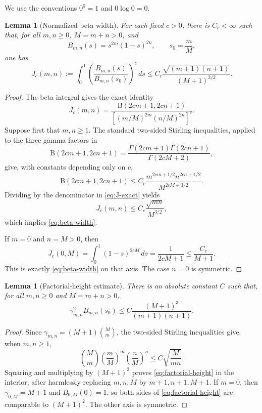 \documentclass[11pt]{article}
\newtheorem{lemma}[theorem]{Lemma}
\newcommand{\dd}{\,d}
\begin{document}
We use the conventions \(0^0=1\) and \(0\log0=0\).

\begin{lemma}[Normalized beta width]\label{lem:beta}
For each fixed \(c>0\), there is \(C_c<\infty\) such that, for all
\(m,n\geq0\), \(M=m+n>0\), and
\[
 B_{m,n}(s)=s^{2m}(1-s)^{2n},\qquad s_0=\frac mM,
\]
one has
\begin{equation}\label{eq:beta-width}
 J_c(m,n):=\int_0^1
 \left(\frac{B_{m,n}(s)}{B_{m,n}(s_0)}\right)^c\dd s
 \leq C_c\frac{\sqrt{(m+1)(n+1)}}{(M+1)^{3/2}}.
\end{equation}
\end{lemma}

\begin{proof}
The beta integral gives the exact identity
\begin{equation}\label{eq:J-exact}
 J_c(m,n)=
 \frac{\mathrm B(2cm+1,2cn+1)}
 {\left[(m/M)^{2m}(n/M)^{2n}\right]^c}.
\end{equation}
Suppose first that \(m,n\geq1\).  The standard two-sided Stirling
inequalities, applied to the three gamma factors in
\[
 \mathrm B(2cm+1,2cn+1)
 =\frac{\Gamma(2cm+1)\Gamma(2cn+1)}
        {\Gamma(2cM+2)},
\]
give, with constants depending only on \(c\),
\[
 \mathrm B(2cm+1,2cn+1)
 \leq C_c
 \frac{m^{2cm+1/2}n^{2cn+1/2}}
      {M^{2cM+3/2}}.
\]
Dividing by the denominator in \eqref{eq:J-exact} yields
\[
 J_c(m,n)\leq C_c\frac{\sqrt{mn}}{M^{3/2}},
\]
which implies \eqref{eq:beta-width}.

If \(m=0\) and \(n=M>0\), then
\[
 J_c(0,M)=\int_0^1(1-s)^{2cM}\dd s
 =\frac1{2cM+1}\leq\frac{C_c}{M+1}.
\]
This is exactly \eqref{eq:beta-width} on that axis.  The case \(n=0\) is
symmetric.
\end{proof}

\begin{lemma}[Factorial-height estimate]\label{lem:factorial}
There is an absolute constant \(C\) such that, for all \(m,n\geq0\) and
\(M=m+n>0\),
\begin{equation}\label{eq:factorial-height}
 \gamma_{m,n}^2 B_{m,n}(s_0)
 \leq C\frac{(M+1)^3}{(m+1)(n+1)}.
\end{equation}
\end{lemma}

\begin{proof}
Since \(\gamma_{m,n}=(M+1)\binom{M}{m}\), the two-sided Stirling
inequalities give, when \(m,n\geq1\),
\[
 \binom{M}{m}
 \left(\frac mM\right)^m
 \left(\frac nM\right)^n
 \leq C\sqrt{\frac{M}{mn}}.
\]
Squaring and multiplying by \((M+1)^2\) proves
\eqref{eq:factorial-height} in the interior, after harmlessly replacing
\(m,n,M\) by \(m+1,n+1,M+1\).  If \(m=0\), then
\(\gamma_{0,M}=M+1\) and \(B_{0,M}(0)=1\), so both sides of
\eqref{eq:factorial-height} are comparable to \((M+1)^2\).  The other axis
is symmetric.
\end{proof}
\end{document}
